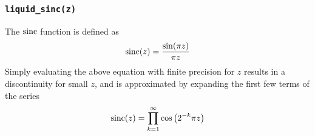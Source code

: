 % 
%
\subsubsection{{\tt liquid\_sinc(z)}}
\label{module:math:transcendentals:sinc}
The $\textup{sinc}$ function is defined as
%
\begin{equation}
\label{eqn:math:sinc}
    \textup{sinc}(z) = \frac{\sin(\pi z)}{\pi z}
\end{equation}
%
Simply evaluating the above equation with finite precision for $z$ results in
a discontinuity for small $z$, and is approximated by expanding the first few
terms of the series
%
\begin{equation}
\label{eqn:math:sinc_expanded}
    \textup{sinc}(z) = \prod_{k=1}^{\infty}{ \cos\left( 2^{-k} \pi z \right) }
\end{equation}

%
%
